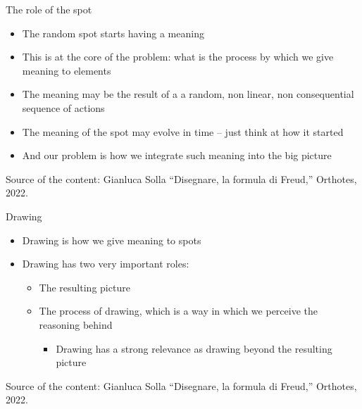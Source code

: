 \documentclass{beamer}
\begin{document}
\begin{frame}
{\centerline{The role of the spot}}
 
\begin{itemize}
    \item The random spot starts having a meaning
    \item This is at the core of the problem: what is the process by which we give meaning to elements
    \item The meaning may be the result of a a random, non linear, non consequential sequence of actions
    \item The meaning of the spot may evolve in time -- just think at how it started
    \item And our problem is how we integrate such meaning into the big picture
\end{itemize} 

\begin{center}
\tiny
Source of the content: Gianluca Solla ``Disegnare, la formula di Freud,'' Orthotes, 2022.
\end{center}
\end{frame}

\begin{frame}
{\centerline{Drawing}}
 
\begin{itemize}
    \item Drawing is how we give meaning to spots
    \item Drawing has two very important roles:
 \begin{itemize}
    \item  The resulting picture
    \item The process of drawing, which is a way in which we perceive the reasoning behind
 \begin{itemize}
    \item  Drawing has a strong relevance as drawing beyond the resulting picture
    \end{itemize} 
\end{itemize} 
 \end{itemize} 


\begin{center}
\tiny
Source of the content: Gianluca Solla ``Disegnare, la formula di Freud,'' Orthotes, 2022.
\end{center}
\end{frame}
\end{document}
